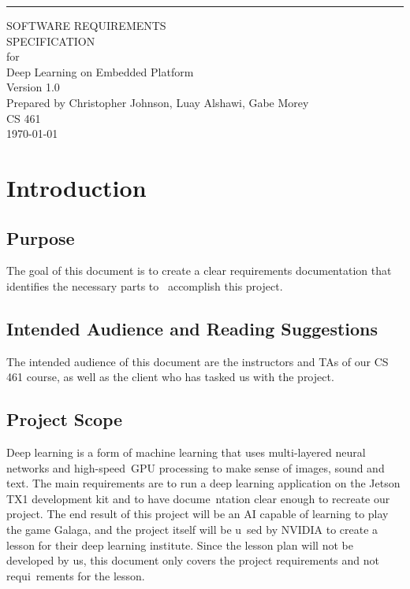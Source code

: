\documentclass{scrreprt}
\date{}
\def\myversion{1.0 }
\begin{document}
\begin{flushright}
    \rule{16cm}{5pt}\vskip1cm
    \begin{bfseries}
        \Huge{SOFTWARE REQUIREMENTS\\ SPECIFICATION}\\
        \vspace{1.9cm}
        for\\
        \vspace{1.9cm}
        Deep Learning on Embedded Platform\\
        \vspace{1.9cm}
        \LARGE{Version \myversion}\\
        \vspace{1.9cm}
        Prepared by Christopher Johnson, Luay Alshawi, Gabe Morey\\
        \vspace{1.9cm}
        CS 461\\
        \vspace{1.9cm}
        \today\\
    \end{bfseries}
\end{flushright}

\tableofcontents

\chapter{Introduction}

\section{Purpose}
The goal of this document is to create a clear requirements documentation that identifies the necessary parts to \
accomplish this project.

\section{Intended Audience and Reading Suggestions}
The intended audience of this document are the instructors and TAs of our CS 461 course, as well as the client who has tasked us with the project.

\section{Project Scope}
Deep learning is a form of machine learning that uses multi-layered neural networks and high-speed\
 GPU processing to make sense of images, sound and text.
The main requirements are to run a deep learning application on the Jetson TX1 development kit and to have docume\
ntation clear enough to recreate our project.
The end result of this project will be an AI capable of learning to play the game Galaga, and the project itself will be u\
sed by NVIDIA to create a lesson for their deep learning institute.
Since the lesson plan will not be developed by us, this document only covers the project requirements and not requi\
rements for the lesson.
\end{document}
